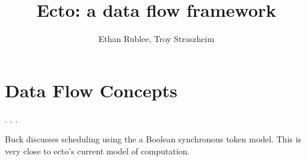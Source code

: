 \documentclass[10pt,a4paper]{article}
\author{Ethan Rublee, Troy Straszheim}
\title{Ecto: a data flow framework}
\date{}
\begin{document}
\maketitle
\section{Data Flow Concepts}
\cite{dennis}.
\cite{formal_flow}.
\cite{sdf}.
\cite{dataflow_process_networks}

Buck \cite{buck93} discusses scheduling using the a Boolean
synchronous token model.  This is very close to ecto's current model of computation.



\end{document}
